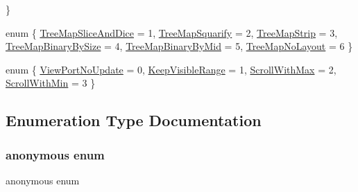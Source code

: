 \begin{DoxyCompactItemize}
 \}
\item 
enum \{ \newline
\hyperlink{namespace_chart_ab1242f03d435704e2f5e626b8fb27670a933b7bea2dbc0073268d9a4135419f16}{Tree\+Map\+Slice\+And\+Dice} = 1, 
\hyperlink{namespace_chart_ab1242f03d435704e2f5e626b8fb27670a78fd88ed053c8587e9017f1b6d888872}{Tree\+Map\+Squarify} = 2, 
\hyperlink{namespace_chart_ab1242f03d435704e2f5e626b8fb27670a43162b11a72f79453e69f15fddfe4532}{Tree\+Map\+Strip} = 3, 
\hyperlink{namespace_chart_ab1242f03d435704e2f5e626b8fb27670a0e1d2232625353fa83a775d660e63a91}{Tree\+Map\+Binary\+By\+Size} = 4, 
\newline
\hyperlink{namespace_chart_ab1242f03d435704e2f5e626b8fb27670a51bf803a9946833ac955a91c1b6e0a7b}{Tree\+Map\+Binary\+By\+Mid} = 5, 
\hyperlink{namespace_chart_ab1242f03d435704e2f5e626b8fb27670a1d437a3c3cadf9ed70e7bf37238dc8cb}{Tree\+Map\+No\+Layout} = 6
 \}
\item 
enum \{ \hyperlink{namespace_chart_a021fe9674561a730fc5ec4cbc540839aa7b48f3c93a4714d6e9ba9b772581ac11}{View\+Port\+No\+Update} = 0, 
\hyperlink{namespace_chart_a021fe9674561a730fc5ec4cbc540839aa2bc42dc30d1c11a32d3928422512b25c}{Keep\+Visible\+Range} = 1, 
\hyperlink{namespace_chart_a021fe9674561a730fc5ec4cbc540839aa1d1549f9d98174a2daf03510d18ada96}{Scroll\+With\+Max} = 2, 
\hyperlink{namespace_chart_a021fe9674561a730fc5ec4cbc540839aa050dc5857b0533fb616f42aa400548be}{Scroll\+With\+Min} = 3
 \}
\end{DoxyCompactItemize}


\subsection{Enumeration Type Documentation}
\mbox{\label{namespace_chart_af8836e6a6deb09b53aaa8f888ad57503}} 
\subsubsection{\texorpdfstring{anonymous enum}{anonymous enum}}
{\footnotesize\ttfamily anonymous enum}

